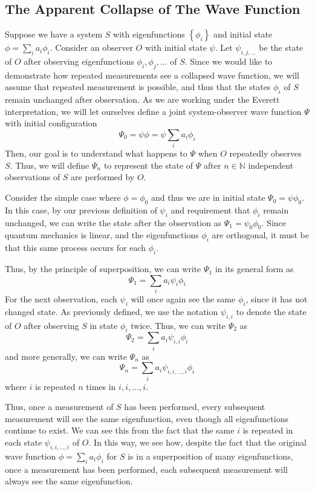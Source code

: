 \documentclass[
    12pt,
    letterpaper,
    aps,
    prd,
    longbibliography,
    twocolumn,
    nofootinbib,
    raggedbottom,
    amsmath,
    amssymb,
    amsfonts,
]{revtex4-1}
\newcommand{\set}[1]{\left\{#1\right\}}
\newcommand{\mbb}[1]{\mathbb{#1}}
\begin{document}
\subsection{The Apparent Collapse of The Wave Function}
\label{sec:mwi}

Suppose we have a system $S$ with eigenfunctions $\set{\phi_i}$ and initial state $\phi = \sum_i a_i \phi_i$. Consider an observer $O$ with initial state $\psi$. Let $\psi_{i,j,\ldots}$ be the state of $O$ after observing eigenfunctions $\phi_i, \phi_j, \ldots$ of $S$. Since we would like to demonstrate how repeated measurements see a collapsed wave function, we will assume that repeated measurement is possible, and thus that the states $\phi_i$ of $S$ remain unchanged after observation. As we are working under the Everett interpretation, we will let ourselves define a joint system-observer wave function $\Psi$ with initial configuration
\[
    \Psi_0 = \psi \phi = \psi \sum_i a_i \phi_i
\]
Then, our goal is to understand what happens to $\Psi$ when $O$ repeatedly observes $S$. Thus, we will define $\Psi_n$ to represent the state of $\Psi$ after $n \in \mbb N$ independent observations of $S$ are performed by $O$.

Consider the simple case where $\phi = \phi_0$ and thus we are in initial state $\Psi_0 = \psi \phi_0$. In this case, by our previous definition of $\psi_i$ and requirement that $\phi_i$ remain unchanged, we can write the state after the observation as $\Psi_1 = \psi_0 \phi_0$. Since quantum mechanics is linear, and the eigenfunctions $\phi_i$ are orthogonal, it must be that this same process occurs for each $\phi_i$.

Thus, by the principle of superposition, we can write $\Psi_1$ in its general form as
\[
    \Psi_1 = \sum_i a_i \psi_i \phi_i
\]
For the next observation, each $\psi_i$ will once again see the same $\phi_i$, since it has not changed state. As previously defined, we use the notation $\psi_{i, i}$ to denote the state of $O$ after observing $S$ in state $\phi_i$ twice. Thus, we can write $\Psi_2$ as
\[
    \Psi_2 = \sum_i a_i \psi_{i,i} \phi_i
\]
and more generally, we can write $\Psi_n$ as
\[
    \Psi_n = \sum_i a_i \psi_{i,i,\ldots,i} \phi_i
\]
where $i$ is repeated $n$ times in $i,i,\ldots,i$.

Thus, once a measurement of $S$ has been performed, every subsequent measurement will see the same eigenfunction, even though all eigenfunctions continue to exist. We can see this from the fact that the same $i$ is repeated in each state $\psi_{i,i,\ldots,i}$ of $O$. In this way, we see how, despite the fact that the original wave function $\phi = \sum_i a_i \phi_i$ for $S$ is in a superposition of many eigenfunctions, once a measurement has been performed, each subsequent measurement will always see the same eigenfunction.
\end{document}
